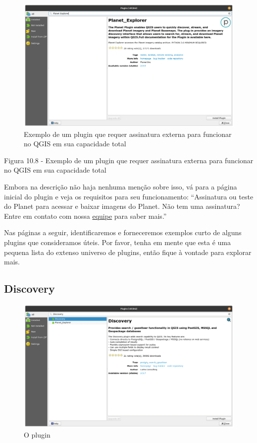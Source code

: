 \documentclass[
]{krantz}
\begin{document}
\begin{figure}
\centering
\includegraphics{media/modulo10/fig108.png}
\caption{Exemplo de um plugin que requer assinatura externa para funcionar no QGIS em sua capacidade total}
\end{figure}

Figura 10.8 - Exemplo de um plugin que requer assinatura externa para funcionar no QGIS em sua capacidade total

Embora na descrição não haja nenhuma menção sobre isso, vá para a página inicial do plugin e veja os requisitos para seu funcionamento: ``Assinatura ou teste do Planet para acessar e baixar imagens do Planet. Não tem uma assinatura? Entre em contato com nossa \href{https://www.planet.com/contact/}{equipe} para saber mais.''

Nas páginas a seguir, identificaremos e forneceremos exemplos curto de alguns plugins que consideramos úteis. Por favor, tenha em mente que esta é uma pequena lista do extenso universo de plugins, então fique à vontade para explorar mais.

\hypertarget{discovery}{%
\subsection{Discovery}\label{discovery}}

\begin{figure}
\centering
\includegraphics{media/modulo10/fig109_a.png}
\caption{O plugin}
\end{figure}
\end{document}
